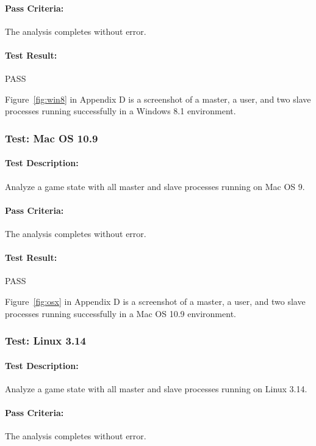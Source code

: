\documentclass[pdftex,12pt,a4paper]{article}
\begin{document}
\paragraph{Pass Criteria:} The analysis completes without error.

\paragraph{Test Result:} PASS

Figure~\ref{fig:win8} in Appendix D is a screenshot of a master, a user, and two slave processes running successfully in a Windows 8.1 environment.

\subsubsection{\textbf{Test:} Mac OS 10.9}

\paragraph{Test Description:} Analyze a game state with all master and slave processes running on Mac OS 9.

\paragraph{Pass Criteria:} The analysis completes without error.

\paragraph{Test Result:} PASS

Figure~\ref{fig:osx} in Appendix D is a screenshot of a master, a user, and two slave processes running successfully in a Mac OS 10.9 environment.

\subsubsection{\textbf{Test:} Linux 3.14}

\paragraph{Test Description:} Analyze a game state with all master and slave processes running on Linux 3.14.

\paragraph{Pass Criteria:} The analysis completes without error.
\end{document}
